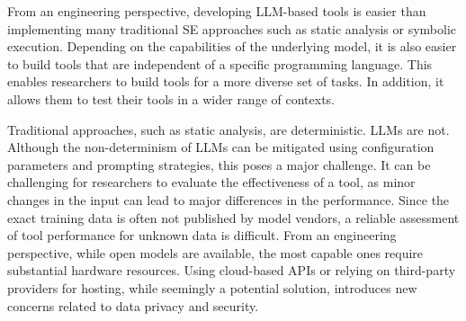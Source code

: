 From an engineering perspective, developing LLM-based tools is easier than implementing many traditional SE approaches such as static analysis or symbolic execution.
Depending on the capabilities of the underlying model, it is also easier to build tools that are independent of a specific programming language.
This enables researchers to build tools for a more diverse set of tasks.
In addition, it allows them to test their tools in a wider range of contexts.


Traditional approaches, such as static analysis, are deterministic. LLMs are not.
Although the non-determinism of LLMs can be mitigated using configuration parameters and prompting strategies, this poses a major challenge.
It can be challenging for researchers to evaluate the effectiveness of a tool, as minor changes in the input can lead to major differences in the performance.
Since the exact training data is often not published by model vendors, a reliable assessment of tool performance for unknown data is difficult.
From an engineering perspective, while open models are available, the most capable ones require substantial hardware resources.
Using cloud-based APIs or relying on third-party providers for hosting, while seemingly a potential solution, introduces new concerns related to data privacy and security.
